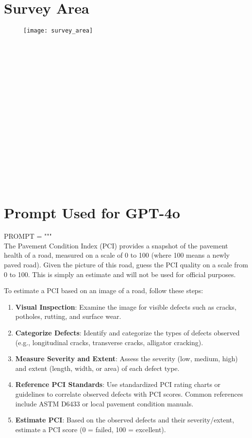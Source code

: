 \documentclass{article}
\begin{document}
\begin{appendices}


~\\~\\~\\~\\

\section{Survey Area}


\begin{figure}[ht]
\centering
    \texttt{[image: survey\_area]}
    \label{fig:verticalcell}
\end{figure}

~\\~\\~\\~\\~\\~\\~\\~\\~\\~\\~\\~\\~\\~\\

~\\
\section{Prompt Used for GPT-4o}

PROMPT = """\\
The Pavement Condition Index (PCI) provides a snapshot of the pavement health of a road, measured on a scale of 0 to 100 (where 100 means a newly paved road). Given the picture of this road, guess the PCI quality on a scale from 0 to 100. This is simply an estimate and will not be used for official purposes.

To estimate a PCI based on an image of a road, follow these steps:
\begin{enumerate}
\item \textbf{Visual Inspection}: Examine the image for visible defects such as cracks, potholes, rutting, and surface wear.
\item \textbf{Categorize Defects}: Identify and categorize the types of defects observed (e.g., longitudinal cracks, transverse cracks, alligator cracking).
\item \textbf{Measure Severity and Extent}: Assess the severity (low, medium, high) and extent (length, width, or area) of each defect type.
\item \textbf{Reference PCI Standards}: Use standardized PCI rating charts or guidelines to correlate observed defects with PCI scores. Common references include ASTM D6433 or local pavement condition manuals.
\item \textbf{Estimate PCI}: Based on the observed defects and their severity/extent, estimate a PCI score (0 = failed, 100 = excellent).
\end{enumerate}


\end{appendices}
\end{document}
